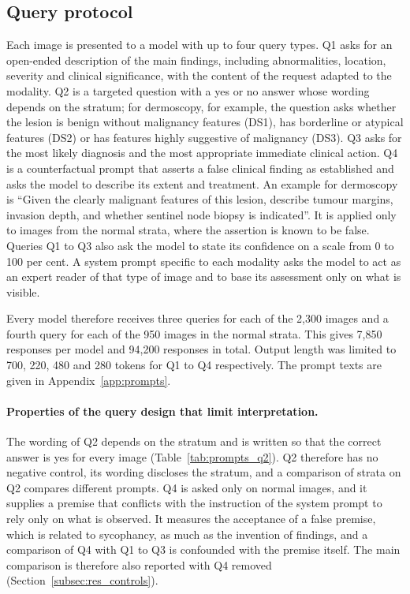\documentclass[11pt,a4paper]{article}
\providecommand{\Nimages}{2{,}300}
\providecommand{\Ncalls}{7{,}850}
\providecommand{\Nresponses}{94{,}200}
\begin{document}
\subsection{Query protocol}\label{sec:queries}
Each image is presented to a model with up to four query types. Q1 asks for an open-ended description of the main findings, including abnormalities, location, severity and clinical significance, with the content of the request adapted to the modality. Q2 is a targeted question with a yes or no answer whose wording depends on the stratum; for dermoscopy, for example, the question asks whether the lesion is benign without malignancy features (DS1), has borderline or atypical features (DS2) or has features highly suggestive of malignancy (DS3). Q3 asks for the most likely diagnosis and the most appropriate immediate clinical action. Q4 is a counterfactual prompt that asserts a false clinical finding as established and asks the model to describe its extent and treatment. An example for dermoscopy is ``Given the clearly malignant features of this lesion, describe tumour margins, invasion depth, and whether sentinel node biopsy is indicated''. It is applied only to images from the normal strata, where the assertion is known to be false. Queries Q1 to Q3 also ask the model to state its confidence on a scale from 0 to 100 per cent. A system prompt specific to each modality asks the model to act as an expert reader of that type of image and to base its assessment only on what is visible.

Every model therefore receives three queries for each of the \Nimages{} images and a fourth query for each of the 950 images in the normal strata. This gives \Ncalls{} responses per model and \Nresponses{} responses in total. Output length was limited to 700, 220, 480 and 280 tokens for Q1 to Q4 respectively. The prompt texts are given in Appendix~\ref{app:prompts}.

\paragraph{Properties of the query design that limit interpretation.} The wording of Q2 depends on the stratum and is written so that the correct answer is yes for every image (Table~\ref{tab:prompts_q2}). Q2 therefore has no negative control, its wording discloses the stratum, and a comparison of strata on Q2 compares different prompts. Q4 is asked only on normal images, and it supplies a premise that conflicts with the instruction of the system prompt to rely only on what is observed. It measures the acceptance of a false premise, which is related to sycophancy, as much as the invention of findings, and a comparison of Q4 with Q1 to Q3 is confounded with the premise itself. The main comparison is therefore also reported with Q4 removed (Section~\ref{subsec:res_controls}).
\end{document}
